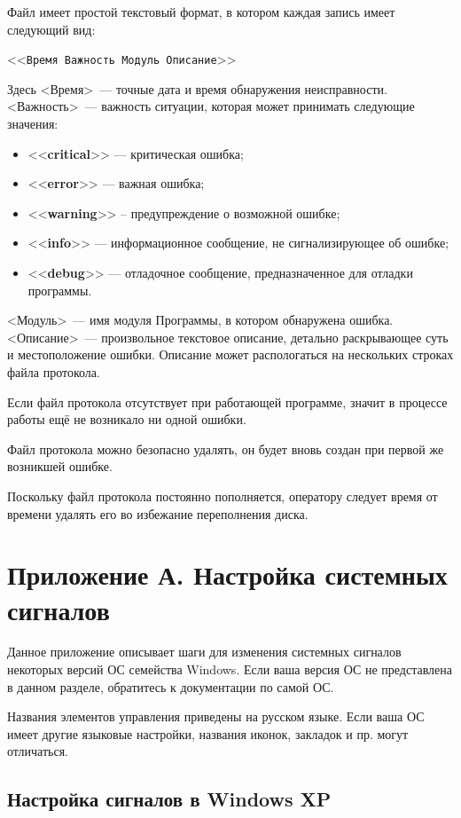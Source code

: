 \documentclass[12pt, a4paper, twocolumn]{book}
\newcommand{\CTL}[1]{<<{\bf #1}>>}
\newcommand{\CMD}[1]{<<{\tt #1}>>}
\begin{document}
Файл имеет простой текстовый формат, в котором каждая запись имеет следующий вид:

\CMD{Время Важность Модуль Описание}

Здесь <Время>~--- точные дата и время обнаружения неисправности. <Важность>~--- важность ситуации, которая может принимать следующие значения:

\begin{itemize}
\item \CTL{critical} --- критическая ошибка;
\item \CTL{error} --- важная ошибка;
\item \CTL{warning} -- предупреждение о возможной ошибке;
\item \CTL{info} --- информационное сообщение, не сигнализирующее об ошибке;
\item \CTL{debug} --- отладочное сообщение, предназначенное для отладки программы.
\end{itemize}

<Модуль>~--- имя модуля Программы, в котором обнаружена ошибка. <Описание>~--- произвольное текстовое описание, детально раскрывающее суть и местоположение ошибки. Описание может распологаться на нескольких строках файла протокола.

Если файл протокола отсутствует при работающей программе, значит в процессе работы ещё не возникало ни одной ошибки.

Файл протокола можно безопасно удалять, он будет вновь создан при первой же возникшей ошибке.

Поскольку файл протокола постоянно пополняется, оператору следует время от времени удалять его во избежание переполнения диска.

\chapter*{Приложение А. Настройка системных сигналов}
\label{sec_system_sounds}

Данное приложение описывает шаги для изменения системных сигналов некоторых версий ОС семейства Windows. Если ваша версия ОС не представлена в данном разделе, обратитесь к документации по самой ОС.

Названия элементов управления приведены на русском языке. Если ваша ОС имеет другие языковые настройки, названия иконок, закладок и пр. могут отличаться.

\section*{Настройка сигналов в Windows XP}
\end{document}
